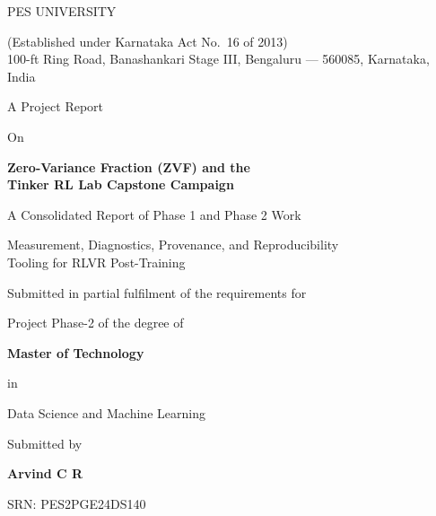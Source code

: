 \documentclass[12pt,a4paper]{report}
\begin{document}
\hypersetup{pageanchor=false}

\begin{titlepage}
\centering
\thispagestyle{empty}
\vspace*{0.05in}

{\large PES UNIVERSITY\par}
{\footnotesize (Established under Karnataka Act No.\ 16 of 2013)\\
100-ft Ring Road, Banashankari Stage III, Bengaluru --- 560085, Karnataka, India\par}

\vspace{0.25in}
{\normalsize A Project Report\par}
{\normalsize On\par}
\vspace{0.5em}
{\Large\bfseries Zero-Variance Fraction (ZVF) and the\\[0.25em]
Tinker RL Lab Capstone Campaign\par}
\vspace{0.6em}
{\normalsize A Consolidated Report of Phase 1 and Phase 2 Work\par}
\vspace{0.35em}
{\small Measurement, Diagnostics, Provenance, and Reproducibility\\ Tooling for RLVR Post-Training\par}

\vfill

{\large Submitted in partial fulfilment of the requirements for\par}
{\large Project Phase-2 of the degree of\par}
\vspace{0.6em}
{\large\bfseries Master of Technology\par}
\vspace{0.2em}
{\normalsize in\par}
\vspace{0.2em}
{\large Data Science and Machine Learning\par}

\vfill

{\normalsize Submitted by\par}
\vspace{0.3em}
{\large\bfseries Arvind C R\par}
{\normalsize SRN: PES2PGE24DS140\par}


\end{titlepage}
\end{document}
